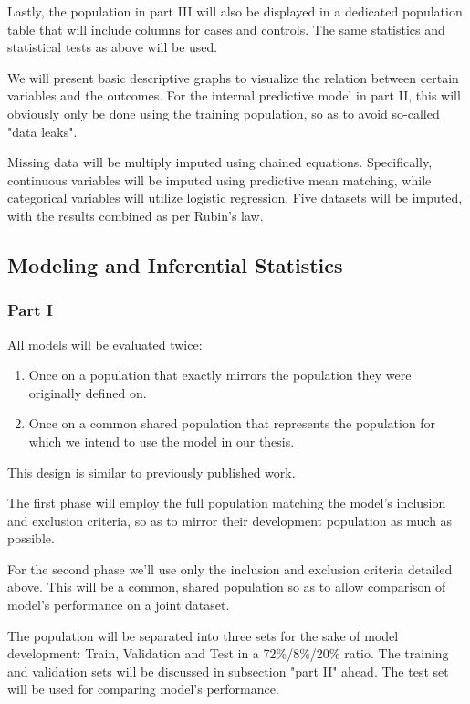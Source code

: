 \documentclass[a4paper,12pt]{article}
\begin{document}
	Lastly, the population in part III will also be displayed in a dedicated population table that will include columns for cases and controls. The same statistics and statistical tests as above will be used.
	
	We will present basic descriptive graphs to visualize the relation between certain variables and the outcomes. For the internal predictive model in part II, this will obviously only be done using the training population, so as to avoid so-called "data leaks".
	
	Missing data will be multiply imputed using chained equations. Specifically, continuous variables will be imputed using predictive mean matching, while categorical variables will utilize logistic regression\cite{Buuren2011}. Five datasets will be imputed, with the results combined as per Rubin's law\cite{Rubin1987}.
	
	\subsection{Modeling and Inferential Statistics}
	
		\subsubsection{Part I}

		All models will be evaluated twice:
		\begin{enumerate}
			\item Once on a population that exactly mirrors the population they were originally defined on.
			\item Once on a common shared population that represents the population for which we intend to use the model in our thesis.
		\end{enumerate}
		This design is similar to previously published work\cite{Dagan2017}.
		
		The first phase will employ the full population matching the model's inclusion and exclusion criteria, so as to mirror their development population as much as possible.
		
		For the second phase we'll use only the inclusion and exclusion criteria detailed above. This will be a common, shared population so as to allow comparison of model's performance on a joint dataset.
		
		The population will be separated into three sets for the sake of model development: Train, Validation and Test in a 72\%/8\%/20\% ratio. The training and validation sets will be discussed in subsection "part II" ahead. The test set will be used for comparing model's performance.
		
\end{document}
